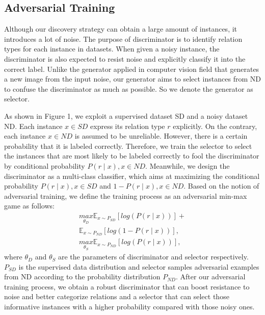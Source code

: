 \documentclass[conference]{IEEEtran}
\begin{document}
\subsection{Adversarial Training}
\label{sect:ad}
Although our discovery strategy can obtain a large amount of instances, it introduces a lot of noise.
The purpose of discriminator is to identify relation types for each instance in datasets.
When given a noisy instance, the discriminator is also expected to resist noise and explicitly classify it into the correct label.  
Unlike the generator applied in computer vision field \cite{im2016generating} that generates a new image from the input noise, our generator aims to select instances from ND to confuse the discriminator as much as possible.
So we denote the generator as selector.

As shown in Figure 1, we exploit a supervised dataset SD and a noisy dataset ND.
Each instance $x \in SD$ express its relation type $r$ explicitly.
On the contrary, each instance $x \in ND$ is assumed to be unreliable.
However, there is a certain probability that it is labeled correctly.
Therefore, we train the selector to select the instances that are most likely to be labeled correctly to fool the discriminator by conditional probability $P\left(r\mid x\right), x \in ND$.
Meanwhile, we design the discriminator as a multi-class classifier, which aims at maximizing the conditional probability $P\left(r\mid x\right), x\in SD$ and $1-P\left(r\mid x\right), x\in ND$.
Based on the notion of adversarial training, we define the training process as an adversarial min-max game as follows: 
\begin{equation}
\begin{aligned}
  \underset{\theta_{D}}{max }\mathbb{E}_{x\sim P_{SD}}\left [ log\left ( P\left ( r\mid x \right ) \right ) \right ]+ \\
  \mathbb{E}_{x\sim P_{ND}}\left [log\left ( 1-P\left ( r\mid x \right ) \right ) \right ], \\
  \underset{\theta_{S}}{max }\mathbb{E}_{x\sim P_{ND}}\left [ log\left ( P\left ( r\mid x \right ) \right ) \right ],
\end{aligned}
\end{equation}
where $\theta_{D}$ and $\theta_{S}$ are the parameters of discriminator and selector respectively.
$P_{SD}$ is the supervised data distribution and selector samples adversarial examples from ND according to the probability distribution $P_{ND}$.
After our adversarial training process, we obtain a robust discriminator that can boost resistance to noise and better categorize relations and a selector that can select those informative instances with a higher probability compared with those noisy ones.
\end{document}
